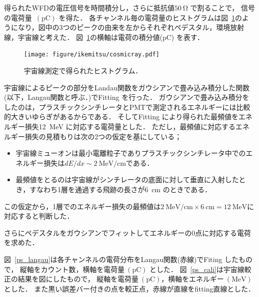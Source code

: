 得られたWFDの電圧信号を時間積分し，さらに抵抗値$50~\mathrm{\Omega}$ で割ることで，
信号の電荷量~$(\mathrm{pC})$ を得た．
各チャンネル毎の電荷量のヒストグラムは図~\ref{cosmicray}のようになり，図中の3つのピークの由来を左からそれぞれペデスタル，環境放射線，宇宙線と考えた．
図~\ref{cosmicray}の横軸は電荷の積分値($\mathrm{pC}$) を表す．
 \begin{figure}[H]
  \centering
  \texttt{[image: figure/ikemitsu/cosmicray.pdf]}
  \caption{宇宙線測定で得られたヒストグラム．}
  \label{cosmicray}
 \end{figure}%

宇宙線によるピークの部分をLandau関数をガウシアンで畳み込み積分した関数(以下，Langau関数と呼ぶ．)でFitting を行った．
ガウシアンで畳み込み積分をしたのは，プラスチックシンチレータとPMTで測定されるエネルギーには比較的大きいゆらぎがあるからである．
そしてFitting により得られた最頻値をエネルギー損失12~MeV に対応する電荷量とした．
ただし，最頻値に対応するエネルギー損失の見積もりは次の2つの仮定を基にしている；
\begin{itemize}
 \item 宇宙線ミューオンは最小電離粒子でありプラスチックシンチレータ中でのエネルギー損失は$dE/dx\sim 2~\mathrm{MeV/cm }$である．
 \item 最頻値をとるのは宇宙線がシンチレータの底面に対して垂直に入射したとき，すなわち1層を通過する飛跡の長さが6~cm のときである．
\end{itemize}
この仮定から，1層でのエネルギー損失の最頻値は$2~\mathrm{MeV/cm}\times6~\mathrm{cm} = 12~\mathrm{MeV }$に対応すると判断した．\cite{leo}

さらにペデスタルをガウシアンでフィットしてエネルギーの0点に対応する電荷を求めた．

図~\ref{ps_langau}は各チャンネルの電荷分布をLangau関数(赤線)でFiting したもので，
縦軸をカウント数，横軸を電荷量$~(\mathrm{pC})$ とした．
図~\ref{ps_cali}は宇宙線較正の結果を図にしたもので，
縦軸を電荷量$~(\mathrm{pC})$，横軸をエネルギー$~(\mathrm{MeV})$ とした．
また黒い誤差バー付きの点を較正点，赤線が直線をfitting直線とした．

